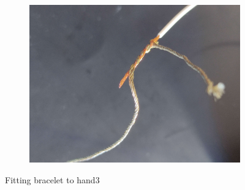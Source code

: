 \documentclass[11pt, a4paper]{article}
\begin{document}
\begin{figure}[h]
\begin{subfigure}[c]{0.31\textwidth}
		\includegraphics[scale=.037]{assets/Connection_thread_wire.jpg}
		\label{fig:Initial_drawing}
	\end{subfigure}
	\caption{Fitting bracelet to hand3}
\end{figure}
\end{document}
